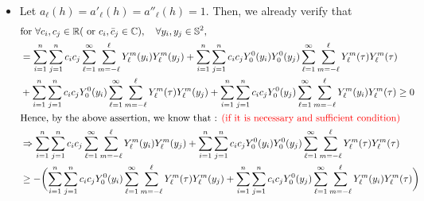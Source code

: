 \documentclass[11pt]{article}
\begin{document}
\begin{itemize}
\begin{align*}
& \sum_{i=1}^n \sum_{j=1}^n c_i c_j \sum_{\ell=1}^{\infty} \sum_{m=-\ell}^{\ell}  a_{\ell}(h_{ij}) Y_{\ell}^{m}(y_i) Y_{\ell}^{m}(y_j) + \sum_{i=1}^n \sum_{j=1}^n c_i c_j Y_{0}^{0}(y_i) Y_{0}^{0}(y_j) \sum_{\ell=1}^{\infty} \sum_{m=-\ell}^{\ell} a'_\ell(h_{ij}) Y_{\ell}^{m}(\tau) Y_{\ell}^{m}(\tau)\\
&\ge -\biggl(\sum_{i=1}^n \sum_{j=1}^n c_i c_j Y_{0}^{0}(y_i) \sum_{\ell=1}^{\infty} \sum_{m=-\ell}^{\ell}  a''_{\ell}(h_{ij}) Y_{\ell}^{m}(\tau) Y_{\ell}^{m}(y_j) + \sum_{i=1}^n \sum_{j=1}^n c_i c_j Y_{0}^{0}(y_j) \sum_{\ell=1}^{\infty} \sum_{m=-\ell}^{\ell}  a''_{\ell}(h_{ij}) Y_{\ell}^{m}(y_i) Y_{\ell}^{m}(\tau) \biggl)\\
\end{align*}

\item
Let $a_\ell(h) = a'_\ell(h) = a''_\ell(h) =1$. Then, we already verify that\\
\begin{align*}
&\text{for } \forall c_i, c_j \in \mathbb{R} (\text{ or } c_i, \bar{c}_j \in \mathbb{C}), \quad \forall y_i, y_j \in \mathbb{S}^2,\\
&= \sum_{i=1}^n \sum_{j=1}^n c_i c_j \sum_{\ell=1}^{\infty} \sum_{m=-\ell}^{\ell} Y_{\ell}^{m}(y_i) Y_{\ell}^{m}(y_j) + \sum_{i=1}^n \sum_{j=1}^n c_i c_j Y_{0}^{0}(y_i) Y_{0}^{0}(y_j) \sum_{\ell=1}^{\infty} \sum_{m=-\ell}^{\ell} Y_{\ell}^{m}(\tau) Y_{\ell}^{m}(\tau)\\
&+ \sum_{i=1}^n \sum_{j=1}^n c_i c_j Y_{0}^{0}(y_i) \sum_{\ell=1}^{\infty} \sum_{m=-\ell}^{\ell} Y_{\ell}^{m}(\tau) Y_{\ell}^{m}(y_j) + \sum_{i=1}^n \sum_{j=1}^n c_i c_j Y_{0}^{0}(y_j) \sum_{\ell=1}^{\infty} \sum_{m=-\ell}^{\ell} Y_{\ell}^{m}(y_i) Y_{\ell}^{m}(\tau) \ge 0\\
&\text{Hence, by the above assertion, we know that : {\color{red} (if it is necessary and sufficient condition)}}\\
&\Rightarrow \sum_{i=1}^n \sum_{j=1}^n c_i c_j \sum_{\ell=1}^{\infty} \sum_{m=-\ell}^{\ell} Y_{\ell}^{m}(y_i) Y_{\ell}^{m}(y_j) + \sum_{i=1}^n \sum_{j=1}^n c_i c_j Y_{0}^{0}(y_i) Y_{0}^{0}(y_j) \sum_{\ell=1}^{\infty} \sum_{m=-\ell}^{\ell} Y_{\ell}^{m}(\tau) Y_{\ell}^{m}(\tau)\\
&\ge -\biggl(\sum_{i=1}^n \sum_{j=1}^n c_i c_j Y_{0}^{0}(y_i) \sum_{\ell=1}^{\infty} \sum_{m=-\ell}^{\ell} Y_{\ell}^{m}(\tau) Y_{\ell}^{m}(y_j) + \sum_{i=1}^n \sum_{j=1}^n c_i c_j Y_{0}^{0}(y_j) \sum_{\ell=1}^{\infty} \sum_{m=-\ell}^{\ell} Y_{\ell}^{m}(y_i) Y_{\ell}^{m}(\tau) \biggl)\\

\end{align*}
\end{itemize}
\end{document}
